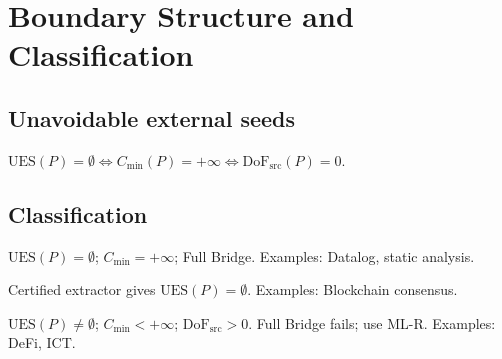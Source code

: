 \section{Boundary Structure and Classification}
\label{sec:cot}

\subsection{Unavoidable external seeds}
\label{subsec:ues}

\begin{theorem}\label{thm:boundary}
$\mathrm{UES}(P)=\emptyset \iff C_{\min}(P)=+\infty \iff \mathrm{DoF}_{\mathrm{src}}(P)=0$.
\end{theorem}

\subsection{Classification}

\begin{definition}
$\mathrm{UES}(P)=\emptyset$; $C_{\min}=+\infty$; Full Bridge. Examples: Datalog, static analysis.
\end{definition}

\begin{definition}
Certified extractor gives $\mathrm{UES}(P)=\emptyset$. Examples: Blockchain consensus.
\end{definition}

\begin{definition}
$\mathrm{UES}(P)\neq\emptyset$; $C_{\min}<+\infty$; $\mathrm{DoF}_{\mathrm{src}}>0$.
Full Bridge fails; use ML-R. Examples: DeFi, ICT.
\end{definition}
